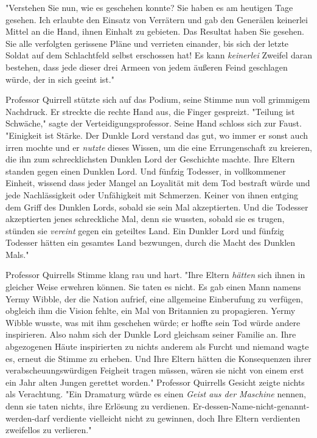 {"Verstehen Sie nun, wie es geschehen konnte? Sie haben es am heutigen Tage gesehen. Ich erlaubte den Einsatz von Verrätern und gab den Generälen keinerlei Mittel an die Hand, ihnen Einhalt zu gebieten. Das Resultat haben Sie gesehen. Sie alle verfolgten gerissene Pläne und verrieten einander, bis sich der letzte Soldat auf dem Schlachtfeld selbst erschossen hat! Es kann \emph{keinerlei} Zweifel daran bestehen, dass jede dieser drei Armeen von jedem äußeren Feind geschlagen würde, der in sich geeint ist."

Professor Quirrell stützte sich auf das Podium, seine Stimme nun voll grimmigem Nachdruck. Er streckte die rechte Hand aus, die Finger gespreizt. "Teilung ist Schwäche," sagte der Verteidigungsprofessor. Seine Hand schloss sich zur Faust. "Einigkeit ist Stärke. Der Dunkle Lord verstand das gut, wo immer er sonst auch irren mochte und er \emph{nutzte} dieses Wissen, um die eine Errungenschaft zu kreieren, die ihn zum schrecklichsten Dunklen Lord der Geschichte machte. Ihre Eltern standen gegen einen Dunklen Lord. Und fünfzig Todesser, in vollkommener Einheit, wissend dass jeder Mangel an Loyalität mit dem Tod bestraft würde und jede Nachlässigkeit oder Unfähigkeit mit Schmerzen. Keiner von ihnen entging dem Griff des Dunklen Lords, sobald sie sein Mal akzeptierten. Und die Todesser akzeptierten jenes schreckliche Mal, denn sie wussten, sobald sie es trugen, stünden sie \emph{vereint} gegen ein geteiltes Land. Ein Dunkler Lord und fünfzig Todesser hätten ein gesamtes Land bezwungen, durch die Macht des Dunklen Mals."

Professor Quirrells Stimme klang rau und hart. "Ihre Eltern \emph{hätten} sich ihnen in gleicher Weise erwehren können. Sie taten es nicht. Es gab einen Mann namens Yermy Wibble, der die Nation aufrief, eine allgemeine Einberufung zu verfügen, obgleich ihm die Vision fehlte, ein Mal von Britannien zu propagieren. Yermy Wibble wusste, was mit ihm geschehen würde; er hoffte sein Tod würde andere inspirieren. Also nahm sich der Dunkle Lord gleichsam seiner Familie an. Ihre abgezogenen Häute inspirierten zu nichts anderem als Furcht und niemand wagte es, erneut die Stimme zu erheben. Und Ihre Eltern hätten die Konsequenzen ihrer verabscheuungswürdigen Feigheit tragen müssen, wären sie nicht von einem erst ein Jahr alten Jungen gerettet worden." Professor Quirrells Gesicht zeigte nichts als Verachtung. "Ein Dramaturg würde es einen \emph{Geist aus der Maschine} nennen, denn sie taten nichts, ihre Erlösung zu verdienen. Er-dessen-Name-nicht-genannt-werden-darf verdiente vielleicht nicht zu gewinnen, doch Ihre Eltern verdienten zweifellos zu verlieren."

}
